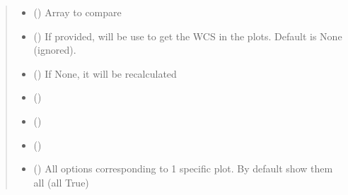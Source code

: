\documentclass[letterpaper,10pt,english]{sphinxmanual}
\begin{document}
\begin{fulllineitems}
\begin{fulllineitems}
\begin{quote}
\begin{description}
\begin{itemize}
\item {} 
\sphinxAtStartPar
{} () \textendash{} Array to compare

\item {} 
\sphinxAtStartPar
{} () \textendash{} If provided, will be use to get the WCS in the plots. Default is None (ignored).

\item {} 
\sphinxAtStartPar
{} () \textendash{} If None, it will be recalculated

\item {} 
\sphinxAtStartPar
{} (\sphinxstyleliteralemphasis{\sphinxupquote{ {[}}}\sphinxstyleliteralemphasis{\sphinxupquote{{]}}}) \textendash{} 

\item {} 
\sphinxAtStartPar
{} (\sphinxstyleliteralemphasis{\sphinxupquote{ {[}}}\sphinxstyleliteralemphasis{\sphinxupquote{{]}}}) \textendash{} 

\item {} 
\sphinxAtStartPar
{} (\sphinxstyleliteralemphasis{\sphinxupquote{ {[}}}\sphinxstyleliteralemphasis{\sphinxupquote{{]}}}) \textendash{} 

\item {} 
\sphinxAtStartPar
{} (\sphinxstyleliteralemphasis{\sphinxupquote{ {[}}}\sphinxstyleliteralemphasis{\sphinxupquote{{]}}}) \textendash{} All options corresponding to 1 specific plot. By default
show them all (all True)


\end{itemize}
\end{description}
\end{quote}
\end{fulllineitems}
\end{fulllineitems}
\end{document}
